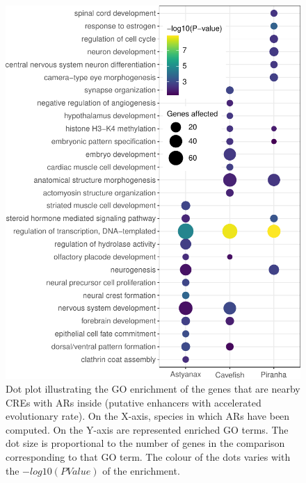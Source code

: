 \begin{figure}
\centering
\includegraphics[width=1\textwidth]{Figures/astyanax/Go_acc_regions}
\caption[GO of ARs]{Dot plot illustrating the GO enrichment of the genes that are nearby CREs with ARs inside (putative enhancers with accelerated evolutionary rate). On the X-axis, species in which ARs have been computed. On the Y-axis are represented enriched GO terms. The dot size is proportional to the number of genes in the comparison corresponding to that GO term. The colour of the dots varies with the $-log10(PValue)$ of the enrichment. }
\label{fig:astmex_acc_regions_GO}
\end{figure}


